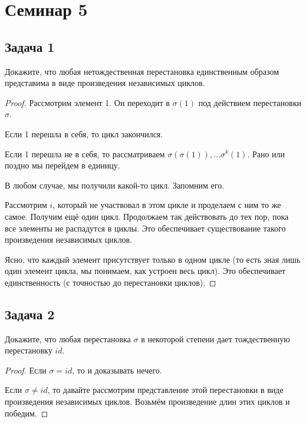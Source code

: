 
\section{Семинар 5}

\subsection{Задача 1}

Докажите, что любая нетождественная перестановка единственным образом представима в виде произведения независимых циклов.

\begin{proof}

Рассмотрим элемент 1. Он переходит в $\sigma(1)$ под действием перестановки $\sigma$.

Если 1 перешла в себя, то цикл закончился.

Если 1 перешла не в себя, то рассматриваем $\sigma(\sigma(1)), \ldots \sigma^k(1)$. Рано или поздно мы перейдем в единицу.

В любом случае, мы получили какой-то цикл. Запомним его.

Рассмотрим $i$, который не участвовал в этом цикле и проделаем с ним то же самое. Получим ещё один цикл. Продолжаем так действовать до тех пор, пока все элементы не распадутся в циклы. Это обеспечивает существование такого произведения независимых циклов.

Ясно, что каждый элемент присутствует только в одном цикле (то есть зная лишь один элемент цикла, мы понимаем, как устроен весь цикл). Это обеспечивает единственность (с точностью до перестановки циклов).
\end{proof}

\subsection{Задача 2}

Докажите, что любая перестановка $\sigma$ в некоторой степени дает тождественную перестановку $id$.

\begin{proof}
Если $\sigma = id$, то и доказывать нечего.

Если $\sigma \neq id$, то давайте рассмотрим представление этой перестановки в виде произведения независимых циклов. Возьмём произведение длин этих циклов и победим.
\end{proof}

